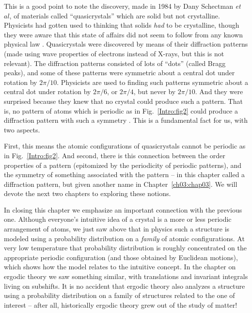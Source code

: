 \documentclass[reqno]{stml-l}
\theoremstyle{plain}
\theoremstyle{definition}
\numberwithin{equation}{chapter}
\begin{document}
This is a good point to note the discovery, made in 1984 by
Dany Schectman \emph{et} $al$, of materials called
``quasicrystals'' which are
solid but not crystalline. Physicists had gotten used to
thinking that solids \emph{had} to be crystalline, though
they were aware that this state of affairs did not seem to
follow from any known physical law \cite{bib:StO, bib:Ra1}.
Quasicrystals were discovered by means of their diffraction
patterns (made using wave properties of electrons instead
of X-rays, but this is not relevant). The diffraction
patterns consisted of lots of ``dots'' (called Bragg
peaks), and some of these patterns were symmetric about a
central dot under rotation by $2\pi/10$. Physicists are
used to finding such patterns symmetric about a central dot
under rotation by $2\pi/6$, or $2\pi/4$, but never by
$2\pi/10$. And they were surprised because they knew that
no crystal could produce such a pattern. That is, no
pattern of atoms which is periodic as in
Fig.~\ref{Intro:fig2} could produce a diffraction pattern
with such a symmetry \cite[p. 84]{bib:HiC}. This is a
fundamental fact for us, with two aspects.

First, this means the atomic configurations of
quasicrystals cannot be periodic as in
Fig.~\ref{Intro:fig2}. And second, there is this connection
between the order properties of a pattern (epitomized by
the periodicity of periodic patterns), and the symmetry of
something associated with the pattern -- in this chapter
called a diffraction pattern, but given another name in
Chapter~\ref{ch03:chap03}. We will devote the next two
chapters to exploring these notions.

In closing this chapter we emphasize an important connection with the previous one. Although everyone's intuitive idea of a crystal is a more or less periodic arrangement of atoms, we just saw above that in physics such a structure is modeled using a probability distribution on a \emph{family} of atomic configurations. At very low temperature that probability distribution is roughly concentrated on the appropriate periodic configuration (and those obtained by Euclidean motions), which shows how the model relates to the intuitive concept. In the chapter on ergodic theory we saw something similar, with translations and invariant integrals living on subshifts. It is no accident that ergodic theory also analyzes a structure using a probability distribution on a family of structures related to the one of interest -- after all, historically ergodic theory grew out of the study of matter!
\end{document}
